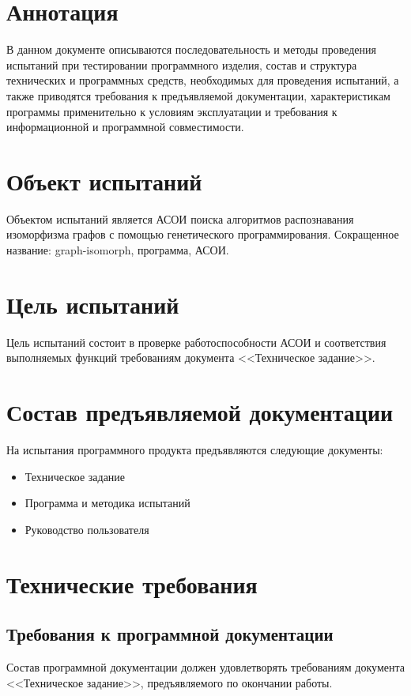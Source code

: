 \documentclass[russian,utf8,emptystyle]{eskdtext}
\begin{document}
\maketitle

\section{Аннотация}
В данном документе описываются последовательность и методы проведения испытаний при тестировании программного изделия, состав и структура технических и программных средств, необходимых для проведения испытаний, а также приводятся требования к предъявляемой документации, характеристикам программы применительно к условиям эксплуатации и требования к информационной и программной совместимости.
\newpage

\tableofcontents
\newpage

\section{Объект испытаний}
Объектом испытаний является АСОИ поиска алгоритмов распознавания изоморфизма графов с помощью генетического программирования. Сокращенное название: graph-isomorph, программа, АСОИ.

\section{Цель испытаний}
Цель испытаний состоит в проверке работоспособности АСОИ и соответствия выполняемых функций требованиям документа <<Техническое задание>>.

\section{Состав предъявляемой документации}
На испытания программного продукта предъявляются следующие документы:
\begin{itemize}
\item Техническое задание
\item Программа и методика испытаний
\item Руководство пользователя
\end{itemize}

\section{Технические требования}
\subsection{Требования к программной документации}
Состав программной документации должен удовлетворять требованиям документа <<Техническое задание>>, предъявляемого по окончании работы.
\end{document}
